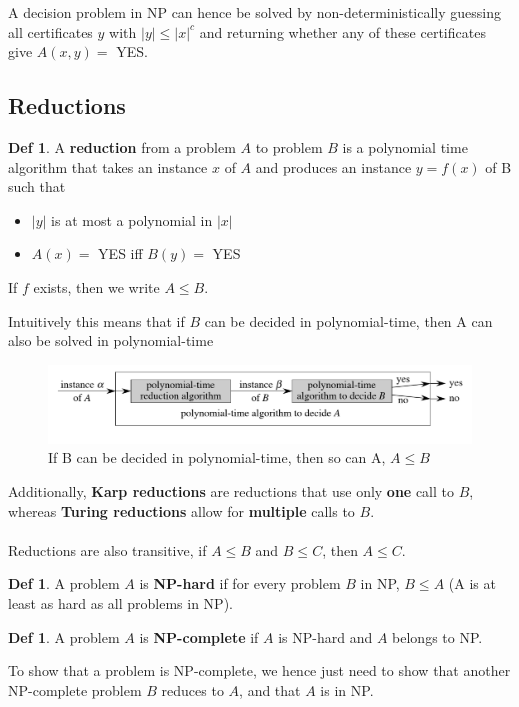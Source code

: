 \documentclass{article}
\theoremstyle{plain}
\theoremstyle{definition}
\newtheorem{defn}[dummy]{Def}
\begin{document}
    A decision problem in NP can hence be solved by non-deterministically guessing all certificates $y$ with $|y| \leq |x|^c$ and returning whether any of these certificates give $A(x,y) = $ YES. 

    \subsection{Reductions}
        \begin{defn}
            A \textbf{reduction} from a problem $A$ to problem $B$ is a polynomial time algorithm that takes an instance $x$ of $A$ and produces an instance $y = f(x)$ of B such that
            \begin{itemize}
                \item $|y|$ is at most a polynomial in $|x|$
                \item $A(x) = $ YES iff $B(y) = $ YES
            \end{itemize}    
            If $f$ exists, then we write $A \leq B$. 
        \end{defn}
        Intuitively this means that if $B$ can be decided in polynomial-time, then A can also be solved in polynomial-time
        \begin{figure}[H]
            \centering
            \includegraphics[width=\linewidth]{images/reduction.png}
            \caption{If B can be decided in polynomial-time, then so can A, $A \leq B$}
            \label{fig:reduction}
        \end{figure}
        Additionally, \textbf{Karp reductions} are reductions that use only \textbf{one} call to $B$, whereas \textbf{Turing reductions} allow for \textbf{multiple} calls to $B$. \\ \\ 
        Reductions are also transitive, if $A \leq B$ and $B \leq C$, then $A \leq C$. 
        \begin{defn}
            A problem $A$ is \textbf{NP-hard} if for every problem $B$ in NP, $B \leq A$ (A is at least as hard as all problems in NP). 
        \end{defn}
        \begin{defn}
            A problem $A$ is \textbf{NP-complete} if $A$ is NP-hard and $A$ belongs to NP. 
        \end{defn}
        To show that a problem is NP-complete, we hence just need to show that another NP-complete problem $B$ reduces to $A$, and that $A$ is in NP. 
\end{document}
